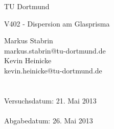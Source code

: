 \documentclass{scrartcl}
\begin{document}
	
	\vspace*{3cm}

	\begin{center}
		\large
		TU Dortmund
	\end{center}

	\begin{center}
		\Huge
		V402 - Dispersion am Glasprisma
	\end{center}


	\vspace{6cm} %
	\begin{center}
		\begin{minipage}[b]{8cm}
			\Large
			Markus Stabrin \\
			\normalsize
			markus.stabrin@tu-dortmund.de \\

			\Large
			Kevin Heinicke\\
			\normalsize
			kevin.heinicke@tu-dortmund.de \\
			\\
			\\

			Versuchsdatum: 21. Mai 2013 \\
			\\
			Abgabedatum: 26. Mai 2013
		\end{minipage}
	\end{center}

	\thispagestyle{empty}

	\newpage

	

	

	

	
\end{document}
